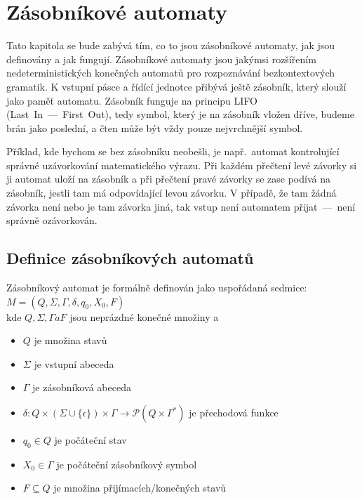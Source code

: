 \chapter{Zásobníkové automaty}

Tato kapitola se bude zabývá tím, co to jsou zásobníkové automaty, jak jsou definovány a jak fungují. Zásobníkové automaty jsou jakýmsi rozšířením nedeterministických konečných automatů pro rozpoznávání bezkontextových gramatik. K vstupní pásce a řídící jednotce přibývá ještě zásobník, který slouží jako paměť automatu. Zásobník funguje na principu LIFO (Last~In~---~First~Out), tedy symbol, který je na zásobník vložen dříve, budeme brán jako poslední, a čten může být vždy pouze nejvrchnější symbol.

Příklad, kde bychom se bez zásobníku neobešli, je např.~automat kontrolující správné uzávorkování matematického výrazu. Při každém přečtení levé závorky si ji automat uloží na zásobník a při přečtení pravé závorky se zase podívá na zásobník, jestli tam má odpovídající levou závorku. V případě, že tam žádná závorka není nebo je tam závorka jiná, tak vstup není automatem přijat~---~není správně ozávorkován.


\section{Definice zásobníkových automatů}\label{sec:DefinitonOfPDA}

Zásobníkový automat je formálně definován jako uspořádaná sedmice:\\
\indent\emph{$M = (Q, \Sigma, \Gamma, \delta, q_0, X_0, F)$}\\
kde $Q, \Sigma, \Gamma a F$ jsou neprázdné konečné množiny a 

\begin{itemize}
    \item $Q$ je množina stavů
    \item $\Sigma$ je vstupní abeceda
    \item $\Gamma$ je zásobníková abeceda
    \item $\delta : Q \times (\Sigma \cup \{\epsilon\}) \times \Gamma \rightarrow \mathcal{P}(Q \times \Gamma^*)$ je přechodová funkce
    \item $q_0 \in Q$ je počáteční stav
    \item $X_0 \in \Gamma$ je počáteční zásobníkový symbol
    \item $F \subseteq Q$ je množina přijímacích/konečných stavů
\end{itemize}

